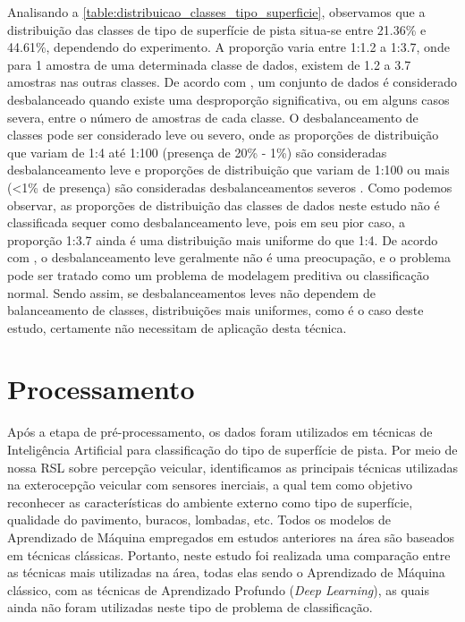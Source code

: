 Analisando a \autoref{table:distribuicao_classes_tipo_superficie}, observamos que a distribuição das classes de tipo de superfície de pista situa-se entre 21.36\% e 44.61\%, dependendo do experimento. A proporção varia entre 1:1.2 a 1:3.7, onde para 1 amostra de uma determinada classe de dados, existem de 1.2 a 3.7 amostras nas outras classes. De acordo com \cite{Fernandez2018}, um conjunto de dados é considerado desbalanceado quando existe uma desproporção significativa, ou em alguns casos severa, entre o número de amostras de cada classe. O desbalanceamento de classes pode ser considerado leve ou severo, onde as proporções de distribuição que variam de 1:4 até 1:100 (presença de 20\% - 1\%) são consideradas desbalanceamento leve e proporções de distribuição que variam de 1:100 ou mais (<1\% de presença) são consideradas desbalanceamentos severos \cite{Krawczyk2016,Brownlee2020}. Como podemos observar, as proporções de distribuição das classes de dados neste estudo não é classificada sequer como desbalanceamento leve, pois em seu pior caso, a proporção 1:3.7 ainda é uma distribuição mais uniforme do que 1:4. De acordo com \cite{Brownlee2020}, o desbalanceamento leve geralmente não é uma preocupação, e o problema pode ser tratado como um problema de modelagem preditiva ou classificação normal. Sendo assim, se desbalanceamentos leves não dependem de balanceamento de classes, distribuições mais uniformes, como é o caso deste estudo, certamente não necessitam de aplicação desta técnica.

\section{Processamento}

Após a etapa de pré-processamento, os dados foram utilizados em técnicas de Inteligência Artificial para classificação do tipo de superfície de pista. Por meio de nossa RSL sobre percepção veicular, identificamos as principais técnicas utilizadas na exterocepção veicular com sensores inerciais, a qual tem como objetivo reconhecer as características do ambiente externo como tipo de superfície, qualidade do pavimento, buracos, lombadas, etc. Todos os modelos de Aprendizado de Máquina empregados em estudos anteriores na área são baseados em técnicas clássicas. Portanto, neste estudo foi realizada uma comparação entre as técnicas mais utilizadas na área, todas elas sendo o Aprendizado de Máquina clássico, com as técnicas de Aprendizado Profundo (\textit{Deep Learning}), as quais ainda não foram utilizadas neste tipo de problema de classificação.

